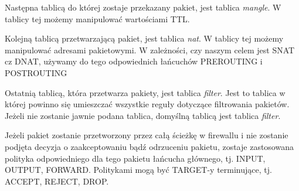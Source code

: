 \documentclass[a4paper,12pt,oneside]{book}
\begin{document}
			Następna tablicą do której zostaje przekazany pakiet, jest tablica \textit{mangle}.
			W tablicy tej możemy manipulować wartościami TTL.

			Kolejną tablicą przetwarzającą pakiet, jest tablica \textit{nat}.
			W tablicy tej możemy manipulować adresami pakietowymi.
			W zależności, czy naszym celem jest SNAT cz DNAT, używamy do tego odpowiednich łańcuchów PREROUTING i POSTROUTING

			Ostatnią tablicą, która przetwarza pakiety, jest tablica \textit{filter}. Jest to tablica w której powinno się umieszczać wszystkie reguły dotyczące filtrowania pakietów. 
			Jeżeli nie zostanie jawnie podana tablica, domyślną tablicą jest tablica \textit{filter}.

			Jeżeli pakiet zostanie przetworzony przez całą ścieżkę w firewallu i nie zostanie podjęta decyzja o zaakceptowaniu bądź odrzuceniu pakietu, zostaje zastosowana polityka odpowiedniego dla tego pakietu łańcucha głównego, tj. INPUT, OUTPUT, FORWARD.
			Politykami mogą być TARGET-y terminujące, tj. ACCEPT, REJECT, DROP.
\end{document}
